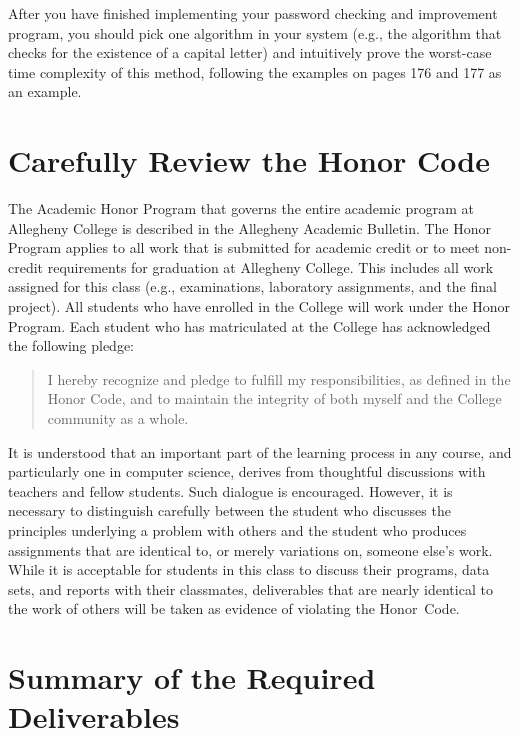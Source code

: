 After you have finished implementing your password checking and improvement program, you should pick one algorithm in
your system (e.g., the algorithm that checks for the existence of a capital letter) and intuitively prove the worst-case
time complexity of this method, following the examples on pages 176 and 177 as an example.

\section*{Carefully Review the Honor Code}

The Academic Honor Program that governs the entire academic program at Allegheny College is described in the Allegheny
Academic Bulletin.  The Honor Program applies to all work that is submitted for academic credit or to meet non-credit
requirements for graduation at Allegheny College.  This includes all work assigned for this class (e.g., examinations,
  laboratory assignments, and the final project).  All students who have enrolled in the College will work under the Honor
Program.  Each student who has matriculated at the College has acknowledged the following pledge:

\vspace*{-.1in}
\begin{quote}
  I hereby recognize and pledge to fulfill my responsibilities, as defined in the Honor Code, and to maintain the
  integrity of both myself and the College community as a whole.
\end{quote}
\vspace*{-.1in}

\noindent It is understood that an important part of the learning process in any course, and particularly one in
computer science, derives from thoughtful discussions with teachers and fellow students.  Such dialogue is encouraged.
However, it is necessary to distinguish carefully between the student who discusses the principles underlying a problem
with others and the student who produces assignments that are identical to, or merely variations on, someone else's
work.  While it is acceptable for students in this class to discuss their programs, data sets, and reports with their
classmates, deliverables that are nearly identical to the work of others will be taken as evidence of violating the
\mbox{Honor Code}.

\section*{Summary of the Required Deliverables}

